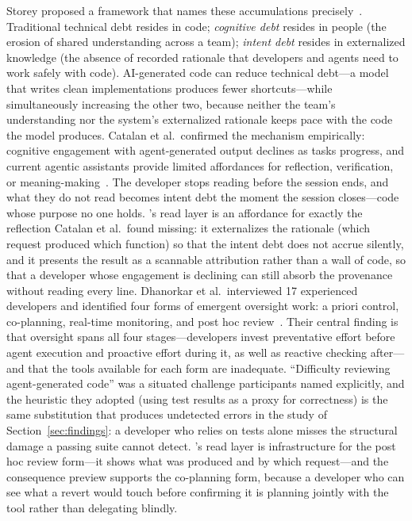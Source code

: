 Storey proposed a framework that names these accumulations
precisely~\cite{storey2026tripledebt}. Traditional technical debt resides in code;
\emph{cognitive debt} resides in people (the erosion of shared understanding across a
team); \emph{intent debt} resides in externalized knowledge (the absence of recorded
rationale that developers and agents need to work safely with code). AI-generated code can
reduce technical debt---a model that writes clean implementations produces fewer
shortcuts---while simultaneously increasing the other two, because neither the team's
understanding nor the system's externalized rationale keeps pace with the code the model
produces. Catalan et al.\ confirmed the mechanism empirically: cognitive engagement with
agent-generated output declines as tasks progress, and current agentic assistants provide
limited affordances for reflection, verification, or
meaning-making~\cite{catalan2026notreading}. The developer stops reading before the
session ends, and what they do not read becomes intent debt the moment the session
closes---code whose purpose no one holds. \sgt{}'s read layer is an affordance for
exactly the reflection Catalan et al.\ found missing: it externalizes the rationale (which
request produced which function) so that the intent debt does not accrue silently, and it
presents the result as a scannable attribution rather than a wall of code, so that a
developer whose engagement is declining can still absorb the provenance without reading
every line.
Dhanorkar et al.\ interviewed 17 experienced developers and identified four forms of
emergent oversight work: a priori control, co-planning, real-time monitoring, and post hoc
review~\cite{dhanorkar2026oversight}. Their central finding is that oversight spans all four stages---developers invest
preventative effort before agent execution and proactive effort during it, as well as
reactive checking after---and that the tools available for each form are inadequate. ``Difficulty reviewing
agent-generated code'' was a situated challenge participants named explicitly, and the
heuristic they adopted (using test results as a proxy for correctness) is the same
substitution that produces undetected errors in the study of
Section~\ref{sec:findings}: a developer who relies on tests alone misses the structural
damage a passing suite cannot detect. \sgt{}'s read layer is infrastructure for the post hoc
review form---it shows what was produced and by which request---and the consequence preview
supports the co-planning form, because a developer who can see what a revert would touch
before confirming it is planning jointly with the tool rather than delegating blindly.

